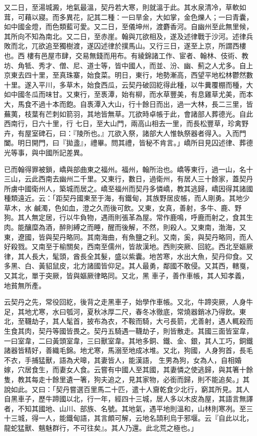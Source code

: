 \begin{pinyinscope}
 又二日，至湯城澱，地氣最溫，契丹若大寒，則就溫于此。其水泉清冷，草軟如茸，可藉以寢。而多異花，記其二種：一曰旱金，大如掌，金色爍人；一曰青囊，如中國金燈，而色類藍可愛。又二日，至儀坤州，渡麝香河。自幽州至此無里候，其所向不知為南北。又二日，至赤崖。翰與兀欲相及，遂及述律戰于沙河。述律兵敗而北，兀欲追至獨樹渡，遂囚述律於撲馬山。又行三日，遂至上京，所謂西樓也。西
 樓有邑屋市肆，交易無錢而用布。有綾錦諸工作、宦者、翰林、伎術、教坊、角牴、秀才、僧、尼、道士等，皆中國人，而並、汾、幽、薊之人尤多。自上京東去四十里，至真珠寨，始食菜。明日，東行，地勢漸高，西望平地松林鬱然數十里。遂入平川，多草木，始食西瓜，云契丹破回紇得此種，以牛糞覆棚而種，大如中國冬瓜而味甘。又東行，至褭潭，始有柳，而水草豐美，有息雞草尤美，而本大，馬食不過十本而飽。自褭潭入大山，行十餘日而出，過一大林，長二三里，皆蕪荑，枝葉有芒刺如箭羽，其地皆無草。兀欲時卓帳于此，會諸部人葬德光。自此西南行，日六十里，行
 七日，至大山門，兩高山相去一里，而長松豐草，珍禽野卉，有屋室碑石，曰：『陵所也。』兀欲入祭，諸部大人惟執祭器者得入。入而門闔。明日開門，曰『拋盞』，禮畢。問其禮，皆秘不肯言。」嶠所目見囚述律、葬德光等事，與中國所記差異。



 已而翰得罪被鎖，嶠與部曲東之福州。福州，翰所治也。嶠等東行，過一山，名十三山，云此西南去幽州二千里。又東行，數日，過衛州，有居人三十餘家，蓋契丹所虜中國衛州人，築城而居之。嶠至福州而契丹多憐嶠，教其逃歸，嶠因得其諸國種類遠近。云：「距契丹國東至于海，有鐵甸，其族野居皮帳，而人剛勇。其地少草木，水
 鹹濁，色如血，澄之久而後可飲。又東，女真，善射，多牛、鹿、野狗。其人無定居，行以牛負物，遇雨則張革為屋。常作鹿鳴，呼鹿而射之，食其生肉。能釀糜為酒，醉則縛之而睡，醒而後解，不然，則殺人。又東南，渤海，又東，遼國，皆與契丹略同。其南海曲，有魚鹽之利。又南，奚，與契丹略同，而人好殺戮。又南至于榆關矣，西南至儒州，皆故漢地。西則突厥、回紇。西北至嫗厥律，其人長大，髦頭，酋長全其髮，盛以紫囊。地苦寒，水出大魚，契丹仰食。又多黑、白、黃貂鼠皮，北方諸國皆仰足。其人最勇，鄰國不敢侵。又其西，轄戛，又其北，單于突厥，皆與嫗厥律略同。又北，黑
 車子，善作車帳，其人知孝義，地貧無所產。



 云契丹之先，常役回紇，後背之走黑車子，始學作車帳。又北，牛蹄突厥，人身牛足，其地尤寒，水曰瓠河，夏秋冰厚二尺，春冬冰徹底，常燒器銷冰乃得飲。東北，至韈劫子，其人髦首，披布為衣，不鞍而騎，大弓長箭，尤善射，遇人輒殺而生食其肉，契丹等國皆畏之。契丹五騎遇一韈劫子，則皆散走。其國三面皆室韋，一曰室韋，二曰黃頭室韋，三曰獸室韋。其地多銅、鐵、金、銀，其人工巧，銅鐵諸器皆精好，善織毛錦。地尤寒，馬溺至地成冰堆。又北，狗國，人身狗首，長毛不衣，手捕猛獸，語為犬嗥，其妻皆人，能漢語，
 生男為狗，女為人，自相婚嫁，穴居食生，而妻女人食。云嘗有中國人至其國，其妻憐之使逃歸，與其箸十餘隻，教其每走十餘里遺一箸，狗夫追之，見其家物，必銜而歸，則不能追矣。」其說如此。又曰：「契丹嘗選百里馬二十匹，遣十人齎乾食少北行，窮其所見。其人自黑車子，歷牛蹄國以北，行一年，經四十三城，居人多以木皮為屋，其語言無譯者，不知其國地、山川、部族、名號。其地氣，遇平地則溫和，山林則寒冽。至三十三城，得一人，能鐵甸語，其言頗可解，云地名頡利烏于邪堰。云『自此以北，龍蛇猛獸、魑魅群行，不可往矣』。其人乃還。此北荒之極也。」




\end{pinyinscope}
